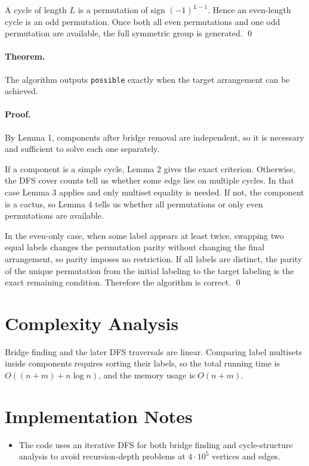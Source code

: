 \documentclass[11pt]{article}
\begin{document}
A cycle of length $L$ is a permutation of sign $(-1)^{L-1}$. Hence an even-length cycle is an odd
permutation. Once both all even permutations and one odd permutation are available, the full symmetric
group is generated. \qed

\paragraph{Theorem.}
The algorithm outputs \texttt{possible} exactly when the target arrangement can be achieved.

\paragraph{Proof.}
By Lemma 1, components after bridge removal are independent, so it is necessary and sufficient to solve
each one separately.

If a component is a simple cycle, Lemma 2 gives the exact criterion. Otherwise, the DFS cover counts tell
us whether some edge lies on multiple cycles. In that case Lemma 3 applies and only multiset equality is
needed. If not, the component is a cactus, so Lemma 4 tells us whether all permutations or only even
permutations are available.

In the even-only case, when some label appears at least twice, swapping two equal labels changes the
permutation parity without changing the final arrangement, so parity imposes no restriction. If all labels
are distinct, the parity of the unique permutation from the initial labeling to the target labeling is the exact
remaining condition. Therefore the algorithm is correct. \qed

\section*{Complexity Analysis}

Bridge finding and the later DFS traversals are linear. Comparing label multisets inside components
requires sorting their labels, so the total running time is $O((n+m) + n \log n)$, and the memory usage is
$O(n+m)$.

\section*{Implementation Notes}

\begin{itemize}[leftmargin=*]
    \item The code uses an iterative DFS for both bridge finding and cycle-structure analysis to avoid
    recursion-depth problems at $4 \cdot 10^5$ vertices and edges.
\end{itemize}
\end{document}
